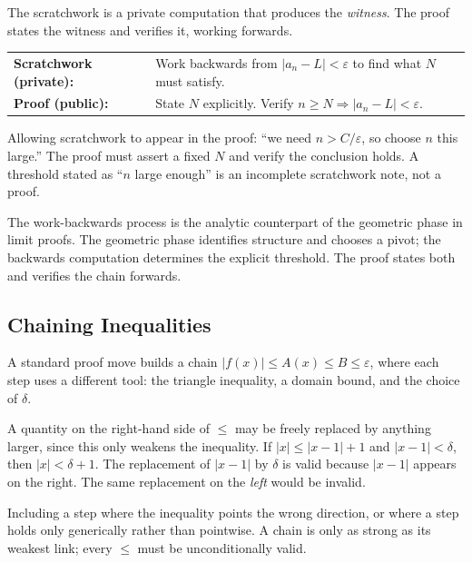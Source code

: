 The scratchwork is a private computation that produces the \emph{witness}.
The proof states the witness and verifies it, working forwards.

\medskip
\begin{tabular}{@{}ll@{}}
\textbf{Scratchwork (private):}
  & Work backwards from $|a_n-L|<\varepsilon$ to find what $N$ must satisfy.\\
\textbf{Proof (public):}
  & State $N$ explicitly. Verify $n\geq N\Rightarrow|a_n-L|<\varepsilon$.
\end{tabular}

\begin{remark}
Allowing scratchwork to appear in the proof: ``we need $n>C/\varepsilon$, so
choose $n$ this large.'' The proof must assert a fixed $N$ and verify the
conclusion holds. A threshold stated as ``$n$ large enough'' is an incomplete
scratchwork note, not a proof.
\end{remark}

\begin{remark}
The work-backwards process is the analytic counterpart of the geometric phase
in limit proofs. The geometric phase identifies structure and chooses a pivot;
the backwards computation determines the explicit threshold. The proof states
both and verifies the chain forwards.
\end{remark}

\subsection*{Chaining Inequalities}
\label{subsec:chaining}

A standard proof move builds a chain
$|f(x)|\leq A(x)\leq B\leq\varepsilon$,
where each step uses a different tool: the triangle inequality, a domain
bound, and the choice of $\delta$.

\begin{remark}
A quantity on the right-hand side of $\leq$ may be freely replaced by
anything larger, since this only weakens the inequality. If
$|x|\leq|x-1|+1$ and $|x-1|<\delta$, then $|x|<\delta+1$. The replacement
of $|x-1|$ by $\delta$ is valid because $|x-1|$ appears on the right. The
same replacement on the \emph{left} would be invalid.
\end{remark}

\begin{remark}
Including a step where the inequality points the wrong direction, or where
a step holds only generically rather than pointwise. A chain is only as
strong as its weakest link; every $\leq$ must be unconditionally valid.
\end{remark}

